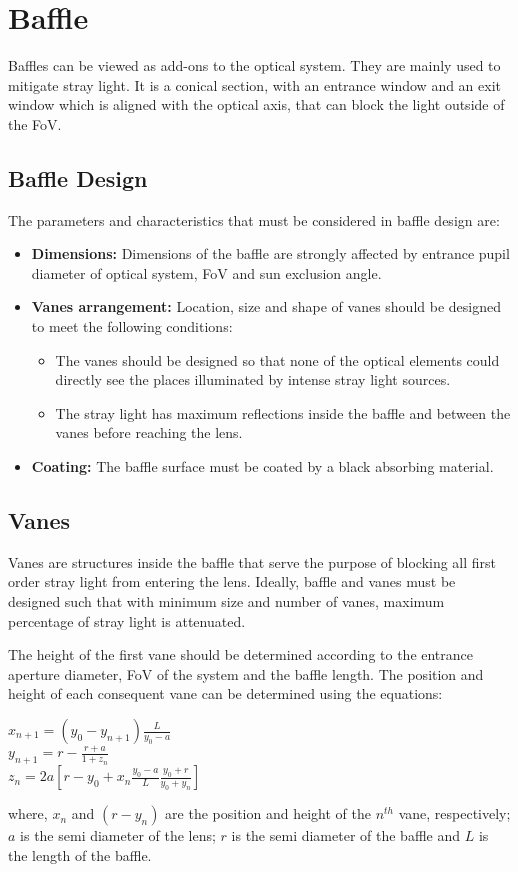 \section{Baffle}
Baffles can be viewed as add-ons to the optical system. They are mainly used to mitigate stray light. It is a conical section, with an entrance window and an exit window which is aligned with the optical axis, that can block the light outside of the FoV.

\subsection{Baffle Design}
The parameters and characteristics that must be considered in baffle design are:
\begin{itemize}
    \item \textbf{Dimensions:} Dimensions of the baffle are strongly affected by entrance pupil diameter of optical system, FoV and sun exclusion angle.
    \item \textbf{Vanes arrangement:} Location, size and shape of vanes should be designed to meet the following conditions:
    \begin{itemize}
        \item The vanes should be designed so that none of the optical elements could directly see the places illuminated by intense stray light sources.
        \item The stray light has maximum reflections inside the baffle and between the vanes before reaching the lens.
    \end{itemize}
    \item \textbf{Coating:} The baffle surface must be coated by a black absorbing material.
\end{itemize}

\subsection{Vanes}
Vanes are structures inside the baffle that serve the purpose of blocking all first order stray light from entering the lens. Ideally, baffle and vanes must be designed such that with minimum size and number of vanes, maximum percentage of stray light is attenuated.
\par
The height of the first vane should be determined according to the entrance  aperture diameter, FoV of the system and the baffle length. The position and height of each consequent vane can be determined using the equations:
\begin{center}
    $x_{n+1}=(y_{0}-y_{n+1})\frac{L}{y_{0}-a}$\\
    \vspace{2em}
    $y_{n+1}=r-\frac{r+a}{1+z_{n}} $\\
    \vspace{2em}
    $z_{n}=2a[r-y_{0}+x_{n}\frac{y_{0}-a}{L}\frac{y_{0}+r}{y_{0}+y_{n}}]$
\end{center}
\par
where, $x_{n}$ and $(r-y_{n})$ are the position and height of the $n^{th}$ vane, respectively; $a$ is the semi diameter of the lens; $r$ is the semi diameter of the baffle and $L$ is the length of the baffle.




